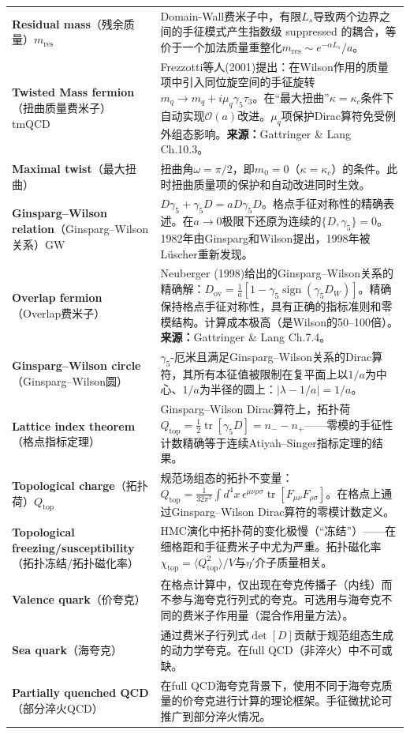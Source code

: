 \documentclass[12pt,a4paper]{ctexart}
\begin{document}
\begin{longtable}{p{3.5cm}p{9cm}}
\textbf{Residual mass}（残余质量）$m_{\text{res}}$& Domain-Wall费米子中，有限$L_s$导致两个边界之间的手征模式产生指数级 suppressed 的耦合，等价于一个加法质量重整化$m_{\text{res}} \sim e^{-\alpha L_s}/a$。\\
\textbf{Twisted Mass fermion}（扭曲质量费米子）tmQCD& Frezzotti等人(2001)提出：在Wilson作用的质量项中引入同位旋空间的手征旋转$m_q \to m_q + i\mu_q\gamma_5\tau_3$。在``最大扭曲''$\kappa=\kappa_c$条件下自动实现$\mathcal{O}(a)$改进。$\mu_q$项保护Dirac算符免受例外组态影响。\textbf{来源：}Gattringer \& Lang Ch.10.3。\\
\textbf{Maximal twist}（最大扭曲）& 扭曲角$\omega=\pi/2$，即$m_0=0$（$\kappa=\kappa_c$）的条件。此时扭曲质量项的保护和自动改进同时生效。\\
\textbf{Ginsparg--Wilson relation}（Ginsparg--Wilson关系）GW& $D\gamma_5 + \gamma_5 D = a D\gamma_5 D$。格点手征对称性的精确表述。在$a\to 0$极限下还原为连续的$\{D,\gamma_5\}=0$。1982年由Ginsparg和Wilson提出，1998年被L\"uscher重新发现。\\
\textbf{Overlap fermion}（Overlap费米子）& Neuberger (1998)给出的Ginsparg--Wilson关系的精确解：$D_{\text{ov}} = \frac{1}{a}[1 - \gamma_5\operatorname{sign}(\gamma_5 D_W)]$。精确保持格点手征对称性，具有正确的指标准则和零模结构。计算成本极高（是Wilson的50--100倍）。\textbf{来源：}Gattringer \& Lang Ch.7.4。\\
\textbf{Ginsparg--Wilson circle}（Ginsparg--Wilson圆）& $\gamma_5$-厄米且满足Ginsparg--Wilson关系的Dirac算符，其所有本征值被限制在复平面上以$1/a$为中心、$1/a$为半径的圆上：$|\lambda - 1/a| = 1/a$。\\
\textbf{Lattice index theorem}（格点指标定理）& Ginsparg--Wilson Dirac算符上，拓扑荷$Q_{\text{top}} = \frac{1}{2}\operatorname{tr}[\gamma_5 D] = n_- - n_+$——零模的手征性计数精确等于连续Atiyah--Singer指标定理的结果。\\
\textbf{Topological charge}（拓扑荷）$Q_{\text{top}}$& 规范场组态的拓扑不变量：$Q_{\text{top}} = \frac{1}{32\pi^2}\int d^4x\, \epsilon^{\mu\nu\rho\sigma}\operatorname{tr}[F_{\mu\nu}F_{\rho\sigma}]$。在格点上通过Ginsparg--Wilson Dirac算符的零模计数定义。\\
\textbf{Topological freezing/susceptibility}（拓扑冻结/拓扑磁化率）& HMC演化中拓扑荷的变化极慢（``冻结''）——在细格距和手征费米子中尤为严重。拓扑磁化率$\chi_{\text{top}} = \langle Q_{\text{top}}^2 \rangle / V$与$\eta'$介子质量相关。\\
\textbf{Valence quark}（价夸克）& 在格点计算中，仅出现在夸克传播子（内线）而不参与海夸克行列式的夸克。可选用与海夸克不同的费米子作用量（混合作用量方法）。\\
\textbf{Sea quark}（海夸克）& 通过费米子行列式$\det[D]$贡献于规范组态生成的动力学夸克。在full QCD（非淬火）中不可或缺。\\
\textbf{Partially quenched QCD}（部分淬火QCD）& 在full QCD海夸克背景下，使用不同于海夸克质量的价夸克进行计算的理论框架。手征微扰论可推广到部分淬火情况。\\
\bottomrule
\end{longtable}
\end{document}
